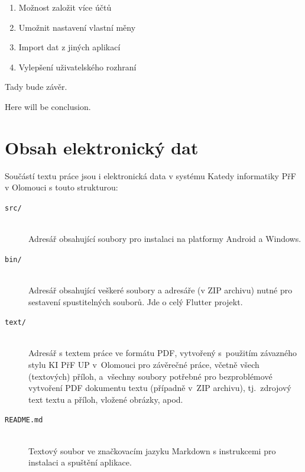 \documentclass[
  biblatex,
  figures=true,
  tables=false,
  glossaries,
  index
]{kidiplom}
\begin{document}
\begin{enumerate}
  \item Možnost založit více účtů
  \item Umožnit nastavení vlastní měny
  \item Import dat z jiných aplikací
  \item Vylepšení uživatelského rozhraní
\end{enumerate}

\begin{kiconclusions}
Tady bude závěr.
\end{kiconclusions}

\begin{kiconclusions}[english]
Here will be conclusion.
\end{kiconclusions}

\appendix
\section{Obsah elektronický dat} \label{sec:ObsahElData}
Součástí textu práce jsou i elektronická data v systému Katedy informatiky PřF v Olomouci s touto strukturou:

\begin{description}

  \item[\texttt{src/}] \hfill \\
    Adresář obsahující soubory pro instalaci na platformy Android a Windows.
  \item[\texttt{bin/}] \hfill \\
    Adresář obsahující veškeré soubory a adresáře (v ZIP archivu) nutné pro sestavení spustitelných souborů. Jde o celý Flutter projekt.
  \item[\texttt{text/}] \hfill \\
    Adresář s textem práce ve formátu PDF, vytvořený s~použitím
    závazného stylu KI PřF UP v~Olomouci pro závěrečné práce, včetně
    všech (textových) příloh, a~všechny soubory potřebné pro
    bezproblémové vytvoření PDF dokumentu textu (případně v~ZIP
    archivu), tj.~zdrojový text textu a příloh, vložené obrázky, apod.
  \item[\texttt{README.md}] \hfill \\
    Textový soubor ve značkovacím jazyku Markdown s instrukcemi pro instalaci a spuštění aplikace.

\end{description}

\end{document}
